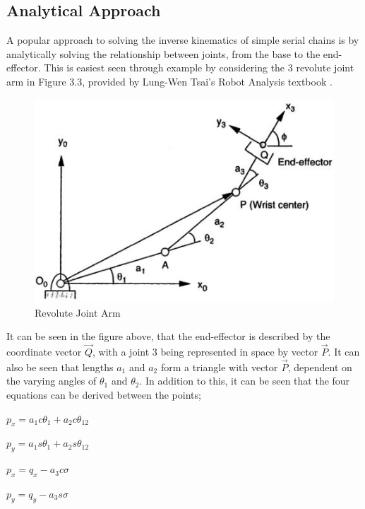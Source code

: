 \documentclass[12pt,openany,a4paper]{book}
\begin{document}
\subsection{Analytical Approach}

A popular approach to solving the inverse kinematics of simple serial chains is by analytically solving the relationship between joints, from the base to the end-effector. This is easiest seen through example by considering the 3 revolute joint arm in Figure 3.3, provided by Lung-Wen Tsai's Robot Analysis textbook \cite{tsai1999robot}.

\begin{center}
\begin{figure}[htb]
  \includegraphics[width=0.8\linewidth]{Tsai_3rr.jpg}
\caption{Revolute Joint Arm}
\end{figure}
\end{center}

It can be seen in the figure above, that the end-effector is described by the coordinate vector $\vec{Q}$, with a joint 3 being represented in space by vector $\vec{P}$. It can also be seen that lengths $a_1$ and $a_2$ form a triangle with vector $\vec{P}$, dependent on the varying angles of $\theta_1$ and $\theta_2$. In addition to this, it can be seen that the four equations can be derived between the points;

\vspace{\baselineskip}
\begin{center}
$p_x = a_1 c\theta_1 + a_2 c \theta_{12}$

$p_y = a_1 s\theta_1 + a_2 s \theta_{12}$

$p_x = q_x - a_3 c\sigma$

$p_y = q_y - a_3 s\sigma$
\end{center}
\vspace{\baselineskip}
\end{document}
